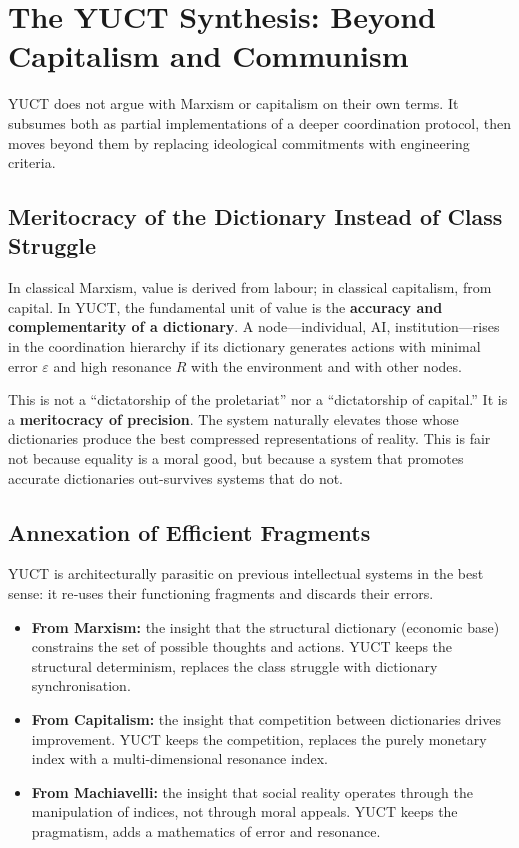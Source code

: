 \documentclass[12pt,a4paper]{article}
\begin{document}
	\section{The YUCT Synthesis: Beyond Capitalism and Communism}
	\label{sec:yuct-synthesis}
	
	YUCT does not argue with Marxism or capitalism on their own terms. It subsumes both as partial implementations of a deeper coordination protocol, then moves beyond them by replacing ideological commitments with engineering criteria.
	
	\subsection{Meritocracy of the Dictionary Instead of Class Struggle}
	
	In classical Marxism, value is derived from labour; in classical capitalism, from capital. In YUCT, the fundamental unit of value is the \textbf{accuracy and complementarity of a dictionary}. A node—individual, AI, institution—rises in the coordination hierarchy if its dictionary generates actions with minimal error \(\varepsilon\) and high resonance \(R\) with the environment and with other nodes.
	
	This is not a ``dictatorship of the proletariat'' nor a ``dictatorship of capital.'' It is a \textbf{meritocracy of precision}. The system naturally elevates those whose dictionaries produce the best compressed representations of reality. This is fair not because equality is a moral good, but because a system that promotes accurate dictionaries out-survives systems that do not.
	
	\subsection{Annexation of Efficient Fragments}
	
	YUCT is architecturally parasitic on previous intellectual systems in the best sense: it re‑uses their functioning fragments and discards their errors.
	
	\begin{itemize}[leftmargin=*]
		\item \textbf{From Marxism:} the insight that the structural dictionary (economic base) constrains the set of possible thoughts and actions. YUCT keeps the structural determinism, replaces the class struggle with dictionary synchronisation.
		\item \textbf{From Capitalism:} the insight that competition between dictionaries drives improvement. YUCT keeps the competition, replaces the purely monetary index with a multi‑dimensional resonance index.
		\item \textbf{From Machiavelli:} the insight that social reality operates through the manipulation of indices, not through moral appeals. YUCT keeps the pragmatism, adds a mathematics of error and resonance.
	\end{itemize}
	
\end{document}
